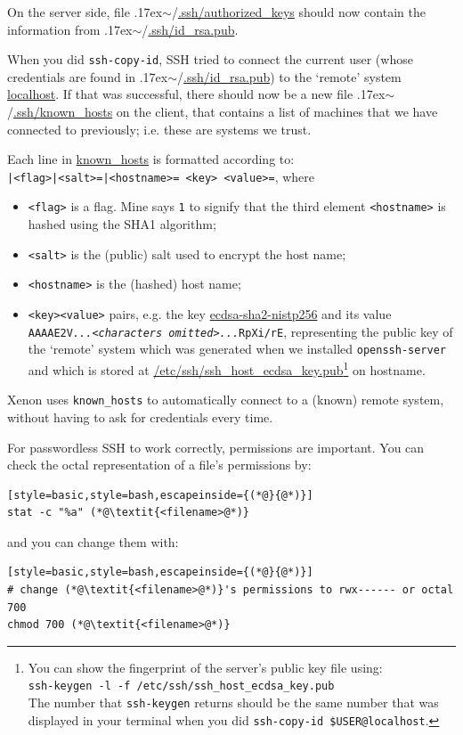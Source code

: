 \documentclass[12pt, a4paper, twoside, openany, titlepage]{book}
\newcommand{\mytilde}{\raise.17ex\hbox{$\scriptstyle\sim$}}
\begin{document}
On the server side, file \mytilde/\url{.ssh/authorized_keys} should now contain the information from \mytilde/\mbox{\url{.ssh/id_rsa.pub}}.



When you did \texttt{ssh-copy-id}, SSH tried to connect the current user (whose credentials are found in \mytilde/\url{.ssh/id_rsa.pub}) to the `remote' system \url{localhost}. If that was successful, there should now be a new file \mytilde/\url{.ssh/known_hosts} on the client, that contains a list of machines that we have connected to previously; i.e. these are systems we trust.

Each line in  \url{known_hosts} is formatted according to: \\
\texttt{|<flag>|<salt>=|<hostname>= <key> <value>=}, where
\begin{itemize}
\item{\texttt{<flag>} is a flag. Mine says \texttt{1} to signify that the third element \texttt{<hostname>} is hashed using the SHA1 algorithm;}
\item{\texttt{<salt>} is the (public) salt used to encrypt the host name;}
\item{\texttt{<hostname>} is the (hashed) host name;}
\item{\texttt{<key>}\texttt{<value>} pairs, e.g. the key \url{ecdsa-sha2-nistp256} and its value\\ \texttt{AAAAE2V\textit{...<characters omitted>...}RpXi/rE}, representing the public key of the `remote' system which was generated when we installed \texttt{openssh-server} and which is stored at \url{/etc/ssh/ssh_host_ecdsa_key.pub}\footnote{You can show the fingerprint of the server's public key file using:\\
\texttt{ssh-keygen -l -f /etc/ssh/ssh\_host\_ecdsa\_key.pub}\\
The number that \texttt{ssh-keygen} returns should be the same number that was displayed in your terminal when you did \texttt{ssh-copy-id \${USER}@localhost}.} on hostname.}
\end{itemize}
Xenon uses \texttt{known\_hosts} to automatically connect to a (known) remote system, without having to ask for credentials every time.

For passwordless SSH to work correctly, permissions are important. You can check the octal representation of a file's permissions by:
\begin{lstlisting}[style=basic,style=bash,escapeinside={(*@}{@*)}]
stat -c "%a" (*@\textit{<filename>@*)}
\end{lstlisting}
and you can change them with:
\begin{lstlisting}[style=basic,style=bash,escapeinside={(*@}{@*)}]
# change (*@\textit{<filename>@*)}'s permissions to rwx------ or octal 700
chmod 700 (*@\textit{<filename>@*)}
\end{lstlisting}
\end{document}
